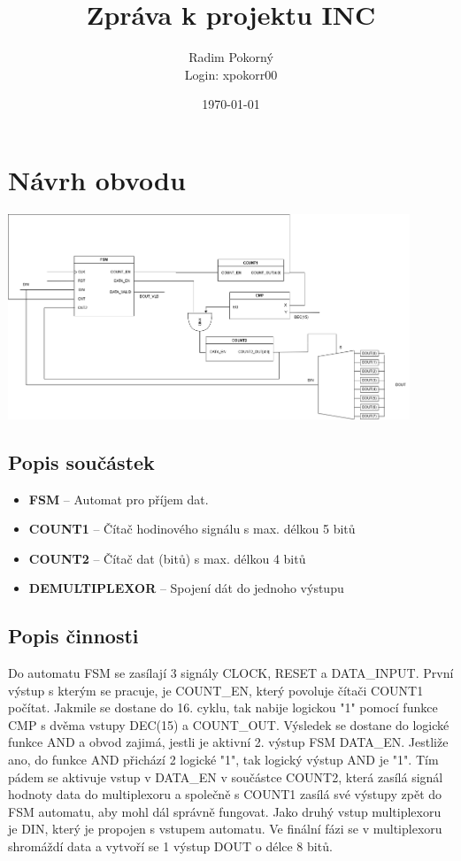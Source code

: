 \documentclass[10pt,a4paper]{article}
\title{\Huge{Zpráva k projektu INC}}
\author{Radim Pokorný \\ Login: xpokorr00}
\date{\today}
\begin{document}
\maketitle

\section{Návrh obvodu}
\begin{center}
    \includegraphics[width=0.9\textwidth]{navrh_obvodu.png}
\end{center}

\subsection{Popis součástek}

\begin{itemize}
    \item \textbf{FSM} -- Automat pro příjem dat.
    \item \textbf{COUNT1} -- Čítač hodinového signálu s max. délkou 5 bitů
    \item \textbf{COUNT2} -- Čítač dat (bitů) s max. délkou 4 bitů
    \item \textbf{DEMULTIPLEXOR} -- Spojení dát do jednoho výstupu
\end{itemize}

\subsection{Popis činnosti}
Do automatu FSM se zasílají 3 signály CLOCK, RESET a DATA\_INPUT. První výstup s kterým se pracuje, je COUNT\_EN, který
povoluje čítači COUNT1 počítat. Jakmile se dostane do 16. cyklu, tak nabije logickou "1" pomocí funkce CMP s dvěma vstupy DEC(15) a COUNT\_OUT.
Výsledek se dostane do logické funkce AND a obvod zajimá, jestli je aktivní 2. výstup FSM DATA\_EN. Jestliže ano, do funkce AND přichází 
2 logické "1", tak logický výstup AND je "1". Tím pádem se aktivuje vstup v DATA\_EN v součástce COUNT2, která zasílá signál hodnoty data do multiplexoru
a společně s COUNT1 zasílá své výstupy zpět do FSM automatu, aby mohl dál správně fungovat. Jako druhý vstup multiplexoru je DIN, který je propojen s vstupem
automatu. Ve finální fázi se v multiplexoru shromáždí data a vytvoří se 1 výstup DOUT o délce 8 bitů.
\end{document}
